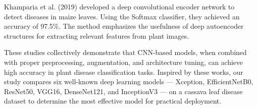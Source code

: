 Khamparia et al. (2019) developed a deep convolutional encoder network to detect diseases in maize leaves. Using the Softmax classifier, they achieved an accuracy of 97.5\%. The method emphasizes the usefulness of deep autoencoder structures for extracting relevant features from plant images.

These studies collectively demonstrate that CNN-based models, when combined with proper preprocessing, augmentation, and architecture tuning, can achieve high accuracy in plant disease classification tasks. Inspired by these works, our study compares six well-known deep learning models — Xception, EfficientNetB0, ResNet50, VGG16, DenseNet121, and InceptionV3 — on a cassava leaf disease dataset to determine the most effective model for practical deployment.
